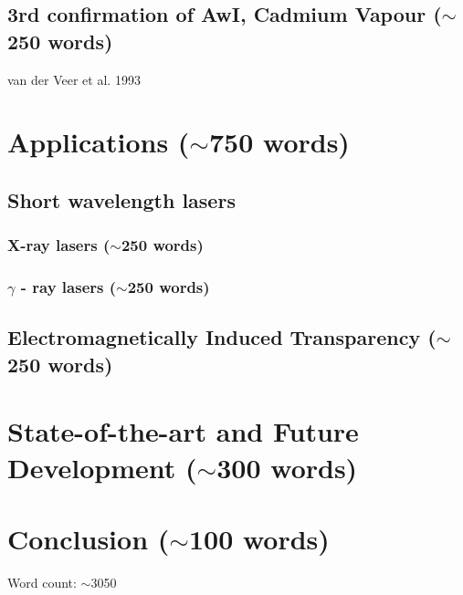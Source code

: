 \documentclass{article}
\begin{document}
\subsection{3rd confirmation of AwI, Cadmium Vapour ($\sim$250 words)}
van der Veer et al. 1993 \cite{PhysRevLett.70.3243}

\section{Applications ($\sim$750 words)}
\subsection{Short wavelength lasers}
\subsubsection{X-ray lasers ($\sim$250 words)}
\subsubsection{$\gamma$ - ray lasers ($\sim$250 words)}
\subsection{Electromagnetically Induced Transparency ($\sim$250 words)}

\section{State-of-the-art and Future Development ($\sim$300 words)}

\section{Conclusion ($\sim$100 words)}

Word count: $\sim$3050
\end{document}
